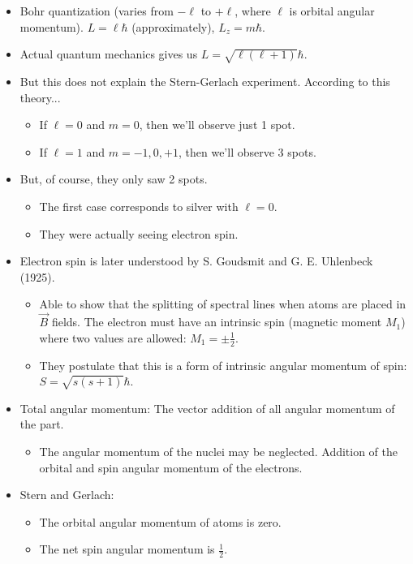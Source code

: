 \documentclass[../notes.tex]{subfiles}
\begin{document}
\begin{itemize}
    \item Bohr quantization (varies from $-\ell$ to $+\ell$, where $\ell$ is orbital angular momentum). $L=\ell\hbar$ (approximately), $L_z=m\hbar$.
    \item Actual quantum mechanics gives us $L=\sqrt{\ell(\ell+1)}\hbar$.
    \item But this does not explain the Stern-Gerlach experiment. According to this theory...
    \begin{itemize}
        \item If $\ell=0$ and $m=0$, then we'll observe just 1 spot.
        \item If $\ell=1$ and $m=-1,0,+1$, then we'll observe 3 spots.
    \end{itemize}
    \item But, of course, they only saw 2 spots.
    \begin{itemize}
        \item The first case corresponds to silver with $\ell=0$.
        \item They were actually seeing electron spin.
    \end{itemize}
    \item Electron spin is later understood by S. Goudsmit and G. E. Uhlenbeck (1925).
    \begin{itemize}
        \item Able to show that the splitting of spectral lines when atoms are placed in $\vec{B}$ fields. The electron must have an intrinsic spin (magnetic moment $M_1$) where two values are allowed: $M_1=\pm\frac{1}{2}$.
        \item They postulate that this is a form of intrinsic angular momentum of spin: $S=\sqrt{s(s+1)}\hbar$.
    \end{itemize}
    \item Total angular momentum: The vector addition of all angular momentum of the part.
    \begin{itemize}
        \item The angular momentum of the nuclei may be neglected. Addition of the orbital and spin angular momentum of the electrons.
    \end{itemize}
    \item Stern and Gerlach:
    \begin{itemize}
        \item The orbital angular momentum of  atoms is zero.
        \item The net spin angular momentum is $\frac{1}{2}$.

\end{itemize}
\end{itemize}
\end{document}
